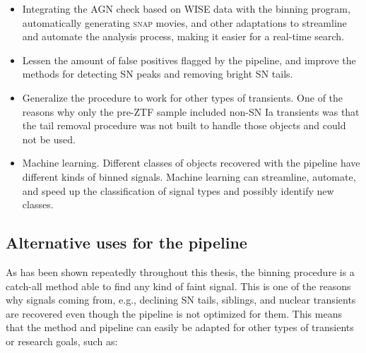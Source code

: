 \documentclass[a4paper,oneside,12pt, class=Latex/Classes/PhDthesisPSnPDF, crop=false]{standalone}
\begin{document}
\begin{itemize}
	\item Integrating the AGN check based on WISE data with the binning program, automatically generating \textsc{snap} movies, and other adaptations to streamline and automate the analysis process, making it easier for a real-time search.
	\item Lessen the amount of false positives flagged by the pipeline, and improve the methods for detecting SN peaks and removing bright SN tails.
	\item Generalize the procedure to work for other types of transients. One of the reasons why only the pre-ZTF sample included non-SN Ia transients was that the tail removal procedure was not built to handle those objects and could not be used.
	\item Machine learning. Different classes of objects recovered with the pipeline have different kinds of binned signals. Machine learning can streamline, automate, and speed up the classification of signal types and possibly identify new classes.
\end{itemize}


\subsection{Alternative uses for the pipeline}
As has been shown repeatedly throughout this thesis, the binning procedure is a catch-all method able to find any kind of faint signal. This is one of the reasons why signals coming from, e.g., declining SN tails, siblings, and nuclear transients are recovered even though the pipeline is not optimized for them. This means that the method and pipeline can easily be adapted for other types of transients or research goals, such as:
\end{document}
